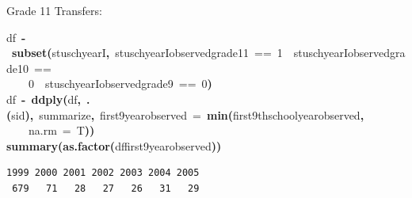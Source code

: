 \documentclass[12pt]{article}
\makeatletter
\newcommand{\hlnumber}[1]{\textcolor[rgb]{0,0,0}{#1}}%
\newcommand{\hlfunctioncall}[1]{\textcolor[rgb]{0.501960784313725,0,0.329411764705882}{\textbf{#1}}}%
\newcommand{\hlkeyword}[1]{\textcolor[rgb]{0,0,0}{\textbf{#1}}}%
\newcommand{\hlargument}[1]{\textcolor[rgb]{0.690196078431373,0.250980392156863,0.0196078431372549}{#1}}%
\newcommand{\hlassignement}[1]{\textcolor[rgb]{0,0,0}{\textbf{#1}}}%
\newcommand{\hlsymbol}[1]{\textcolor[rgb]{0,0,0}{#1}}%
\newcommand{\hlstd}[1]{\textcolor[rgb]{0,0,0}{#1}}%
\newenvironment{kframe}{%
 \def\FrameCommand##1{\hskip\@totalleftmargin \hskip-\fboxsep
 \colorbox{shadecolor}{##1}\hskip-\fboxsep
     \hskip-\linewidth \hskip-\@totalleftmargin \hskip\columnwidth}%
 \MakeFramed {\advance\hsize-\width
   \@totalleftmargin\z@ \linewidth\hsize
   \@setminipage}}%
 {\par\unskip\endMakeFramed}
\newenvironment{knitrout}{}{} %
\renewenvironment{knitrout}{\begin{footnotesize}}{\end{footnotesize}}
\makeatother
\begin{document}
Grade 11 Transfers:
\begin{knitrout}
\color{fgcolor}\begin{kframe}
\begin{flushleft}
\ttfamily\noindent
\hlsymbol{df}{\ }\hlassignement{\usebox{\hlnormalsizeboxlessthan}-}{\ }\hlfunctioncall{subset}\hlkeyword{(}\hlsymbol{stuschyearI}\hlkeyword{,}{\ }\hlsymbol{stuschyearI}\hlkeyword{\usebox{\hlnormalsizeboxdollar}}\hlsymbol{observed\usebox{\hlnormalsizeboxunderscore}grade\usebox{\hlnormalsizeboxunderscore}11}{\ }=={\ }\hlnumber{1}{\ }\hlkeyword{\usebox{\hlnormalsizeboxand}}{\ }\hlsymbol{stuschyearI}\hlkeyword{\usebox{\hlnormalsizeboxdollar}}\hlsymbol{observed\usebox{\hlnormalsizeboxunderscore}grade\usebox{\hlnormalsizeboxunderscore}10}{\ }==\hspace*{\fill}\\
\hlstd{}{\ }{\ }{\ }{\ }\hlnumber{0}{\ }\hlkeyword{\usebox{\hlnormalsizeboxand}}{\ }\hlsymbol{stuschyearI}\hlkeyword{\usebox{\hlnormalsizeboxdollar}}\hlsymbol{observed\usebox{\hlnormalsizeboxunderscore}grade\usebox{\hlnormalsizeboxunderscore}9}{\ }=={\ }\hlnumber{0}\hlkeyword{)}\hspace*{\fill}\\
\hlstd{}\hlsymbol{df}{\ }\hlassignement{\usebox{\hlnormalsizeboxlessthan}-}{\ }\hlfunctioncall{ddply}\hlkeyword{(}\hlsymbol{df}\hlkeyword{,}{\ }\hlfunctioncall{.}\hlkeyword{(}\hlsymbol{sid}\hlkeyword{)}\hlkeyword{,}{\ }\hlsymbol{summarize}\hlkeyword{,}{\ }\hlargument{first9yearobserved}{\ }\hlargument{=}{\ }\hlfunctioncall{min}\hlkeyword{(}\hlsymbol{first9thschoolyear\usebox{\hlnormalsizeboxunderscore}observed}\hlkeyword{,}\hspace*{\fill}\\
\hlstd{}{\ }{\ }{\ }{\ }\hlargument{na.rm}{\ }\hlargument{=}{\ }\hlsymbol{T}\hlkeyword{)}\hlkeyword{)}\hspace*{\fill}\\
\hlstd{}\hlfunctioncall{summary}\hlkeyword{(}\hlfunctioncall{as.factor}\hlkeyword{(}\hlsymbol{df}\hlkeyword{\usebox{\hlnormalsizeboxdollar}}\hlsymbol{first9yearobserved}\hlkeyword{)}\hlkeyword{)}\mbox{}
\normalfont
\end{flushleft}
\begin{verbatim}
1999 2000 2001 2002 2003 2004 2005 
 679   71   28   27   26   31   29 
\end{verbatim}
\end{kframe}
\end{knitrout}
\end{document}
